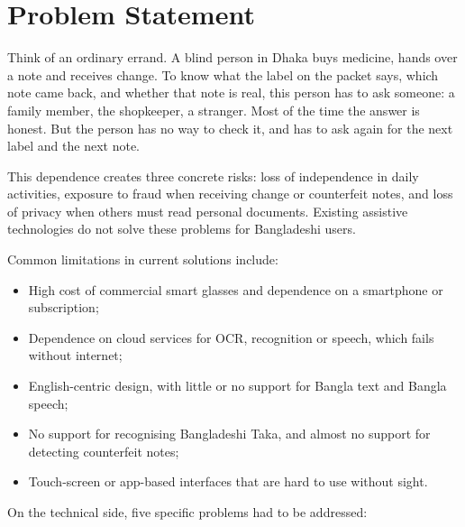 \section{Problem Statement}
\label{sec:Problem Statement}
Think of an ordinary errand. A blind person in Dhaka buys medicine, hands over a note and receives change. To know what the label on the packet says, which note came back, and whether that note is real, this person has to ask someone: a family member, the shopkeeper, a stranger. Most of the time the answer is honest. But the person has no way to check it, and has to ask again for the next label and the next note.

This dependence creates three concrete risks: loss of independence in daily activities, exposure to fraud when receiving change or counterfeit notes, and loss of privacy when others must read personal documents. Existing assistive technologies do not solve these problems for Bangladeshi users.

Common limitations in current solutions include:

\begin{itemize}[noitemsep]
    \item High cost of commercial smart glasses and dependence on a smartphone or subscription;
    \item Dependence on cloud services for OCR, recognition or speech, which fails without internet;
    \item English-centric design, with little or no support for Bangla text and Bangla speech;
    \item No support for recognising Bangladeshi Taka, and almost no support for detecting counterfeit notes;
    \item Touch-screen or app-based interfaces that are hard to use without sight.
\end{itemize}

On the technical side, five specific problems had to be addressed:

